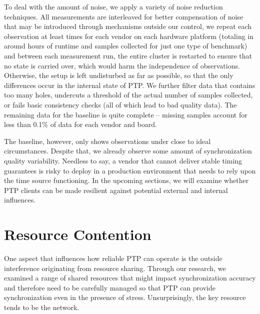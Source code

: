 {To deal with the amount of noise, we apply a variety of noise reduction techniques. All measurements are interleaved for better compensation of noise that may be introduced through mechanisms outside our control, we repeat each observation at least \numBaselineMeasurements{} times for each vendor on each hardware platform (totaling in around  hours of runtime and  samples collected for just one type of benchmark) and between each measurement run, the entire cluster is restarted to ensure that no state is carried over, which would harm the independence of observations. Otherwise, the setup is left undisturbed as far as possible, so that the only differences occur in the internal state of PTP. We further filter data that contains too many holes, undercuts a threshold of the actual number of samples collected, or fails basic consistency checks (all of which lead to bad quality data). The remaining data for the baseline is quite complete -- missing samples account for less than 0.1\% of data for each vendor and board.

The baseline, however, only shows observations under close to ideal circumstances. Despite that, we already observe some amount of synchronization quality variability.
Needless to say, a vendor that cannot deliver stable timing guarantees is risky to deploy in a production environment that needs to rely upon the time source functioning. In the upcoming sections, we will examine whether PTP clients can be made resilient against potential external and internal influences.

}

\section{Resource Contention}
\label{sec:resource_contention}

One aspect that influences how reliable PTP can operate is the outside interference originating from resource sharing. Through our research, we examined a range of shared resources that might impact synchronization accuracy and therefore need to be carefully managed so that PTP can provide synchronization even in the presence of stress. Unsurprisingly, the key resource tends to be the network.

